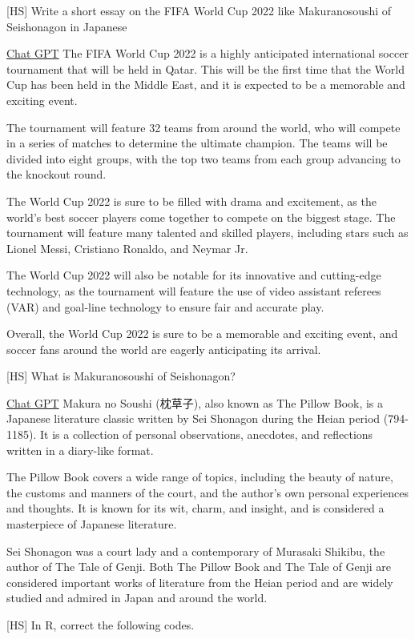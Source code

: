 \documentclass[
]{book}
\theoremstyle{definition}
\theoremstyle{definition}
\theoremstyle{definition}
\theoremstyle{definition}
\theoremstyle{remark}
\begin{document}
{[}HS{]} Write a short essay on the FIFA World Cup 2022 like Makuranosoushi of Seishonagon in Japanese

\protect\hyperlink{chatgpt}{Chat GPT} The FIFA World Cup 2022 is a highly anticipated international soccer tournament that will be held in Qatar. This will be the first time that the World Cup has been held in the Middle East, and it is expected to be a memorable and exciting event.

The tournament will feature 32 teams from around the world, who will compete in a series of matches to determine the ultimate champion. The teams will be divided into eight groups, with the top two teams from each group advancing to the knockout round.

The World Cup 2022 is sure to be filled with drama and excitement, as the world's best soccer players come together to compete on the biggest stage. The tournament will feature many talented and skilled players, including stars such as Lionel Messi, Cristiano Ronaldo, and Neymar Jr.

The World Cup 2022 will also be notable for its innovative and cutting-edge technology, as the tournament will feature the use of video assistant referees (VAR) and goal-line technology to ensure fair and accurate play.

Overall, the World Cup 2022 is sure to be a memorable and exciting event, and soccer fans around the world are eagerly anticipating its arrival.

{[}HS{]} What is Makuranosoushi of Seishonagon?

\protect\hyperlink{chatgpt}{Chat GPT} Makura no Soushi (枕草子), also known as The Pillow Book, is a Japanese literature classic written by Sei Shonagon during the Heian period (794-1185). It is a collection of personal observations, anecdotes, and reflections written in a diary-like format.

The Pillow Book covers a wide range of topics, including the beauty of nature, the customs and manners of the court, and the author's own personal experiences and thoughts. It is known for its wit, charm, and insight, and is considered a masterpiece of Japanese literature.

Sei Shonagon was a court lady and a contemporary of Murasaki Shikibu, the author of The Tale of Genji. Both The Pillow Book and The Tale of Genji are considered important works of literature from the Heian period and are widely studied and admired in Japan and around the world.

{[}HS{]} In R, correct the following codes.
\end{document}
